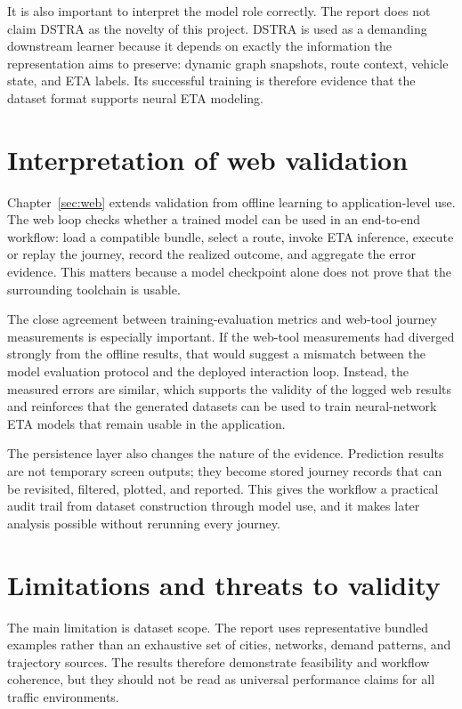 It is also important to interpret the model role correctly. The report does not claim DSTRA as the novelty of this project. DSTRA is used as a demanding downstream learner because it depends on exactly the information the representation aims to preserve: dynamic graph snapshots, route context, vehicle state, and ETA labels. Its successful training is therefore evidence that the dataset format supports neural ETA modeling.

\section{Interpretation of web validation}
Chapter~\ref{sec:web} extends validation from offline learning to application-level use. The web loop checks whether a trained model can be used in an end-to-end workflow: load a compatible bundle, select a route, invoke ETA inference, execute or replay the journey, record the realized outcome, and aggregate the error evidence. This matters because a model checkpoint alone does not prove that the surrounding toolchain is usable.

The close agreement between training-evaluation metrics and web-tool journey measurements is especially important. If the web-tool measurements had diverged strongly from the offline results, that would suggest a mismatch between the model evaluation protocol and the deployed interaction loop. Instead, the measured errors are similar, which supports the validity of the logged web results and reinforces that the generated datasets can be used to train neural-network ETA models that remain usable in the application.

The persistence layer also changes the nature of the evidence. Prediction results are not temporary screen outputs; they become stored journey records that can be revisited, filtered, plotted, and reported. This gives the workflow a practical audit trail from dataset construction through model use, and it makes later analysis possible without rerunning every journey.

\section{Limitations and threats to validity}
The main limitation is dataset scope. The report uses representative bundled examples rather than an exhaustive set of cities, networks, demand patterns, and trajectory sources. The results therefore demonstrate feasibility and workflow coherence, but they should not be read as universal performance claims for all traffic environments.

